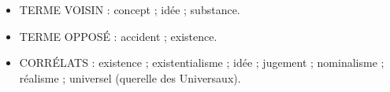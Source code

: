\begin{itemize}[leftmargin=1cm, label=, itemsep=1pt]
\item {\footnotesize TERME VOISIN} : concept ; idée ;
substance.
\item {\footnotesize TERME OPPOSÉ} : accident ; existence.
\item {\footnotesize CORRÉLATS} : existence ; existentialisme ; idée ;
jugement ; nominalisme ; réalisme ;
universel (querelle des Universaux).
\end{itemize}

